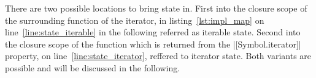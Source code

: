 There are two possible locations to bring state in. First into the 
closure scope of the surrounding function of the iterator, in
listing~\ref{lst:impl_map} on line~\ref{line:state_iterable} in the following 
referred as iterable state. Second into the closure scope of 
the function which is returned from the |[Symbol.iterator]| property, on
line~\ref{line:state_iterator}, reffered to iterator state. Both variants are possible and will 
be discussed in the following.
